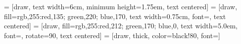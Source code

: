 
 = [draw, text width=6cm,  minimum height=1.75em, text centered]
 = [draw, fill={rgb,255:red,135; green,220; blue,170}, text width=0.75cm, font=\fontsize{6}{7.2}\sffamily, text centered]
 = [draw, fill={rgb,255:red,212; green,170; blue,0}, text width=5.0em, font=\fontsize{6}{7.2}\sffamily, rotate=90, text centered]
 = [draw, thick, color=black!80, font=\footnotesize\sffamily]

\newcommand{\background}[7]{%
    \begin{pgfonlayer}{background}
        \path (#1.west |- #2.north)+(-1,0.4) node (a1) {};
        \path (#3.east |- #4.south)+(+0.4,#5) node (a2) {};
        \path[fill=#6, draw=black!50]
        (a1) rectangle (a2);
        \path let \p{x}=(a1), \p{y}=($(a1)!0.5!(a2)$) in (\x{x}, \y{y})+(0.5,0) node (u1)[rotate=90]
        {#7};
\end{pgfonlayer}}

